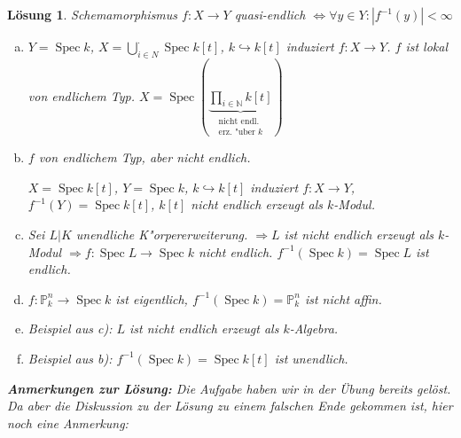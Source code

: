 \documentclass[paper = A4, fontsize=12pt, numbers=noendperiod, chapterprefix=true]{scrbook}
\theoremstyle{break}
\newtheorem{Loes}{L\"osung}
\theoremstyle{nonumberbreak}
\theoremstyle{nonumberplain}
\DeclareMathOperator{\Spec}{Spec}
\newcommand{\N}{\mathbb{N}}
\newcommand{\IP}{\mathbb{P}}%
\begin{document}
\begin{Loes}
Schemamorphismus $f: X \to Y$ quasi-endlich $\Leftrightarrow \forall y \in Y: |f^{-1}(y)| < \infty$

\begin{center}\end{center}
\begin{enumerate}[a)]
\item
	$Y = \Spec k$, $X = \bigcup\limits_{i \in N}^\cdot \Spec k[t]$, $k \hookrightarrow k[t]$ induziert $f: X \to Y$. $f$ ist lokal von endlichem Typ. $X = \Spec (\underbrace{\prod\limits_{i \in \N} k[t]}_{\substack{\text{nicht endl.}\\\text{erz. "uber }k}})$
\item
	$f$ von endlichem Typ, aber nicht endlich.
	
	$X = \Spec k[t]$, $Y = \Spec k$, $k \hookrightarrow k[t]$ induziert $f: X \to Y$, $f^{-1}(Y) = \Spec k[t]$, $k[t]$ nicht endlich erzeugt als $k$-Modul.
\item
	Sei $L|K$ unendliche K"orpererweiterung.	$\Rightarrow L$ ist nicht endlich erzeugt als $k$-Modul $\Rightarrow f: \Spec L \to \Spec k$ nicht endlich. $f^{-1}(\Spec k) = \Spec L$ ist endlich.
\item
	$f: \IP_k^n \to \Spec k$ ist eigentlich, $f^{-1}(\Spec k) = \IP_k^n$ ist nicht affin.
\item
	Beispiel aus c): $L$ ist nicht endlich erzeugt als $k$-Algebra.
\item
	Beispiel aus b): $f^{-1}(\Spec k) = \Spec k[t]$ ist unendlich.
\end{enumerate}
\textbf{Anmerkungen zur Lösung:}
Die Aufgabe haben wir in der Übung bereits gelöst. Da aber die Diskussion zu der Lösung zu einem falschen Ende gekommen ist, hier noch eine Anmerkung:


\end{Loes}
\end{document}
